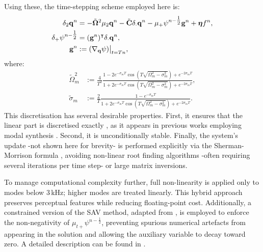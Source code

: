 Using these, the time-stepping scheme employed here is:
\begin{align*}
   \delta_2 {\bf q}^n &= -\tilde{\bf \Omega}^2 \mu_2{\bf q}^n - \tilde{\bf C} \delta_\cdot {\bf q}^n - \mu_{+}\psi^{n-\tfrac{1}{2}} {\bf g}^n + {\boldsymbol \eta} f^n, \\
   \delta_{+} \psi^{n-\tfrac{1}{2}} &= ({\bf g}^n)^\intercal \delta_{\cdot} {\bf q}^n, \\
   {\bf g}^n &:= (\nabla_{\bf q} \psi)\big|_{t = Tn},
\end{align*}
where:
\begin{align*}
\tilde \Omega^2_m &:= \frac{4}{T^2}\frac{1-2e^{-\sigma_m T}\cos(T\sqrt{\Omega_m^2-\sigma_m^2})+e^{-2\sigma_m T}}{1+2e^{-\sigma_m T}\cos(T\sqrt{\Omega_m^2-\sigma_m^2})+e^{-2\sigma_m T}}, \\
\tilde \sigma_m &:= \frac{2}{T}\frac{1-e^{-\sigma_m T}}{1+2e^{-\sigma_m T}\cos(T\sqrt{\Omega^2_m-\sigma_m^2})+e^{-2\sigma_m T}}.
\end{align*}
This discretisation has several desirable properties. First, it ensures that the linear part is discretised exactly \cite{cieslinski_on-exact_2011}, as it appears in previous works employing modal synthesis \cite{van-walstijn_real-time_2016,walstijn_implicit_2024}. Second, it is unconditionally stable. Finally, the system's update -not shown here for brevity- is performed explicitly via the Sherman-Morrison formula \cite{bilbao_explicit_2023,russo_scalar_2024,sherman_adjustment_1950}, avoiding non-linear root finding algorithms -often requiring several iterations per time step- or large matrix inversions.

To manage computational complexity further, full non-linearity is applied only to modes below 3\,kHz; higher modes are treated linearly. This hybrid approach preserves perceptual features while reducing floating-point cost. Additionally, a constrained version of the SAV method, adapted from \cite{walstijn_implicit_2024}, is employed to enforce the non-negativity of $ \mu_{t+}\psi^{n-\frac{1}{2}}$, preventing spurious numerical artefacts from appearing in the solution and allowing the auxiliary variable to decay toward zero. %
A detailed description can be found in \cite{bilbao_real-time_2024, russo_noniterative_2025}.







